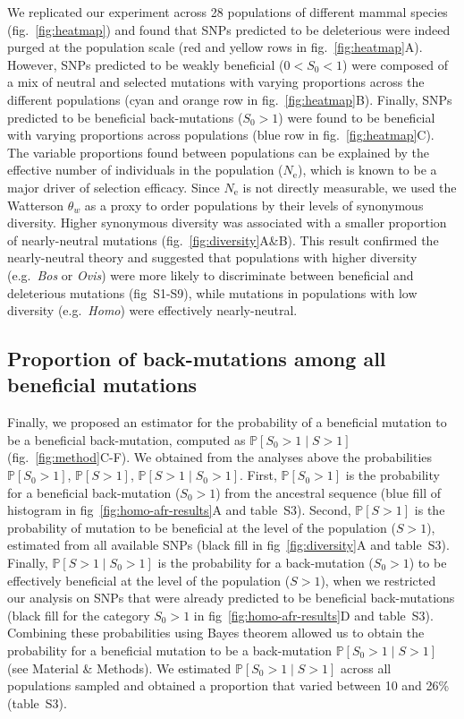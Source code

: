 \documentclass{article}
\newcommand{\Ne}{N_{\textrm{e}}}
\newcommand{\Sphy}{S_{0}}
\newcommand{\divWeakAdv}{0 < \Sphy < 1}
\newcommand{\divAdv}{ \Sphy > 1}
\newcommand{\given}{\mid}
\newcommand{\Spop}{S}
\begin{document}
    We replicated our experiment across 28 populations of different mammal species (fig.~\ref{fig:heatmap}) and found that SNPs predicted to be deleterious were indeed purged at the population scale (red and yellow rows in fig.~\ref{fig:heatmap}A).
    However, SNPs predicted to be weakly beneficial ($\divWeakAdv$) were composed of a mix of neutral and selected mutations with varying proportions across the different populations (cyan and orange row in fig.~\ref{fig:heatmap}B).
    Finally, SNPs predicted to be beneficial back-mutations ($\divAdv$) were found to be beneficial with varying proportions across populations (blue row in fig.~\ref{fig:heatmap}C).
    The variable proportions found between populations can be explained by the effective number of individuals in the population ($\Ne$), which is known to be a major driver of selection efficacy.
    Since $\Ne$ is not directly measurable, we used the Watterson $\theta_w$ as a proxy to order populations by their levels of synonymous diversity.
    Higher synonymous diversity was associated with a smaller proportion of nearly-neutral mutations (fig.~\ref{fig:diversity}A\&B).
    This result confirmed the nearly-neutral theory and suggested that populations with higher diversity (e.g.~\textit{Bos} or \textit{Ovis}) were more likely to discriminate between beneficial and deleterious mutations (fig~S1-S9), while mutations in populations with low diversity (e.g.~\textit{Homo}) were effectively nearly-neutral.

    \subsection*{Proportion of back-mutations among all beneficial mutations}

    Finally, we proposed an estimator for the probability of a beneficial mutation to be a beneficial back-mutation, computed as $\mathbb{P} [ \Sphy > 1  \given  \Spop > 1]$ (fig.~\ref{fig:method}C-F).
    We obtained from the analyses above the probabilities $\mathbb{P} [ \Sphy > 1 ]$, $\mathbb{P} [ \Spop > 1 ]$, $\mathbb{P} [ \Spop > 1  \given  \Sphy > 1]$.
    First, $\mathbb{P} [ \Sphy > 1 ]$ is the probability for a beneficial back-mutation ($\Sphy > 1$) from the ancestral sequence (blue fill of histogram in fig~\ref{fig:homo-afr-results}A and table~S3).
    Second, $\mathbb{P} [ \Spop > 1 ]$ is the probability of mutation to be beneficial at the level of the population ($\Spop > 1$), estimated from all available SNPs (black fill in fig~\ref{fig:diversity}A and table~S3).
    Finally, $\mathbb{P} [ \Spop > 1  \given  \Sphy > 1]$ is the probability for a back-mutation ($\Sphy > 1$) to be effectively beneficial at the level of the population ($\Spop > 1$), when we restricted our analysis on SNPs that were already predicted to be beneficial back-mutations (black fill for the category $\Sphy > 1$ in fig~\ref{fig:homo-afr-results}D and table~S3).
    Combining these probabilities using Bayes theorem allowed us to obtain the probability for a beneficial mutation to be a back-mutation $\mathbb{P} [ \Sphy > 1  \given  \Spop > 1]$ (see Material \& Methods).
    We estimated $\mathbb{P} [ \Sphy > 1  \given  \Spop > 1]$ across all populations sampled and obtained a proportion that varied between 10 and 26\% (table~S3).
\end{document}
